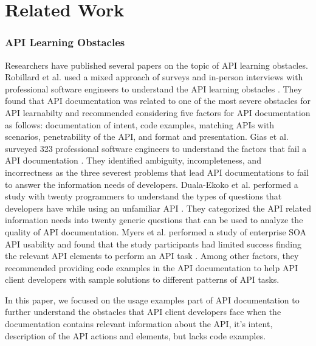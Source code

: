 \documentclass[conference]{IEEEtran}
\begin{document}
\section{Related Work}

\subsubsection{API Learning Obstacles}
  Researchers have published several papers on the topic of API learning obstacles. Robillard et al. used a mixed approach of surveys and in-person interviews with professional software engineers to understand the API learning obstacles \cite{Robillard_what_makes} \cite{Robillard_a_field_study}. They found that API documentation was related to one of the most severe obstacles for API learnabilty and recommended considering five factors for API documentation as follows: documentation of intent, code examples, matching APIs with scenarios, penetrability of the API, and format and presentation. Gias et al. surveyed 323 professional software engineers to understand the factors that fail a API documentation \cite{g_uddin}. They identified ambiguity, incompleteness, and incorrectness as the three severest problems that lead API documentations to fail to answer the information needs of developers. Duala-Ekoko et al. performed a study with twenty programmers to understand the types of questions that developers have while using an unfamiliar API \cite{Duala-Ekoko:2012:AAQ:2337223.2337255}. They categorized the API related information needs into twenty generic questions that can be used to analyze the quality of API documentation. Myers et al. performed a study of enterprise SOA API usability and found that the study participants had limited success finding the relevant API elements to perform an API task \cite{Myers_study}. Among other factors, they recommended providing code examples in the API documentation to help API client developers with sample solutions to different patterns of API tasks.

  In this paper, we focused on the usage examples part of API documentation to further understand the obstacles that API client developers face when the documentation contains relevant information about the API, it's intent, description of the API actions and elements, but lacks code examples.
\end{document}
